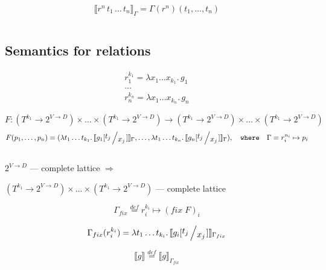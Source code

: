 \[ \llbracket r^n \, t_1 \, \dots \, t_n \rrbracket_{\Gamma} = \Gamma(r^n)(t_1, \dots, t_n) \]

\[\]

\subsection{Semantics for relations}

\[ \begin{array}{l}
r_1^{k_1} = \lambda x_1 \dots x_{k_1}. \, g_1 \\
\dots \\
r_n^{k_n} = \lambda x_1 \dots x_{k_n}. \, g_n
\end{array} \]

\[ F : (T^{k_1} \to 2^{V \to D}) \times \dots \times (T^{k_1} \to 2^{V \to D}) \to (T^{k_1} \to 2^{V \to D}) \times \dots \times (T^{k_1} \to 2^{V \to D}) \]
\[ F(p_1, \dots, p_n) = (\lambda t_1 \dots t_{k_1}. \, \llbracket g_1[\bigslant{t_j}{x_j}] \rrbracket_{\Gamma}, \dots, \lambda t_1 \dots t_{k_n}. \, \llbracket g_n[\bigslant{t_j}{x_j}] \rrbracket_{\Gamma}), \quad \texttt{where} \quad \Gamma = r_i^{n_i} \mapsto p_i  \]

\[ \]

$2^{V \to D}$ --- complete lattice $\Rightarrow$

$(T^{k_1} \to 2^{V \to D}) \times \dots \times (T^{k_1} \to 2^{V \to D})$ --- complete lattice

\[ \Gamma_{fix} \stackrel{def}{=}  r_i^{k_i} \mapsto (fix \; F)_i \]

\[ \Gamma_{fix}(r_i^{k_i}) = \lambda t_1 \dots t_{k_i}. \, \llbracket g_i[\bigslant{t_j}{x_j}] \rrbracket_{\Gamma_{fix}}\]

\[ \llbracket g \rrbracket \stackrel{def}{=} \llbracket g \rrbracket_{\Gamma_{fix}} \]

\[\]

